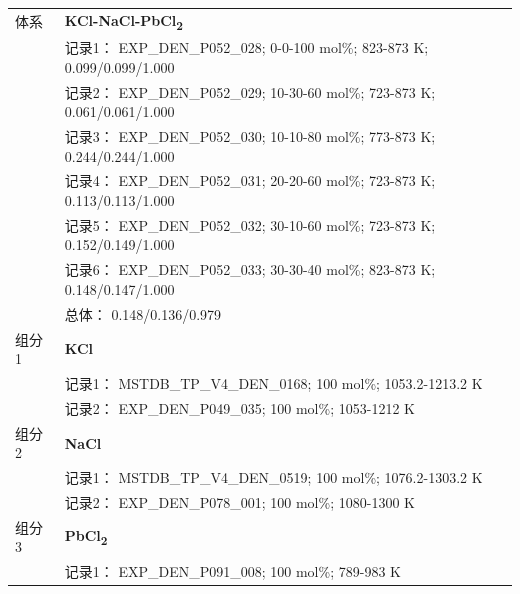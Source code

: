 \documentclass[12pt]{article}
\begin{document}
{\begin{longtable}[]{@{}
  >{\raggedright\arraybackslash}p{}
  >{\raggedright\arraybackslash}p{}@{}}
\midrule
体系 & \textbf{KCl-NaCl-PbCl\textsubscript{2}} \\
 & 记录1： EXP\_DEN\_P052\_028; 0-0-100 mol\%; 823-873 K; 0.099/0.099/1.000 \\
 & 记录2： EXP\_DEN\_P052\_029; 10-30-60 mol\%; 723-873 K; 0.061/0.061/1.000 \\
 & 记录3： EXP\_DEN\_P052\_030; 10-10-80 mol\%; 773-873 K; 0.244/0.244/1.000 \\
 & 记录4： EXP\_DEN\_P052\_031; 20-20-60 mol\%; 723-873 K; 0.113/0.113/1.000 \\
 & 记录5： EXP\_DEN\_P052\_032; 30-10-60 mol\%; 723-873 K; 0.152/0.149/1.000 \\
 & 记录6： EXP\_DEN\_P052\_033; 30-30-40 mol\%; 823-873 K; 0.148/0.147/1.000 \\
 & 总体： 0.148/0.136/0.979  \\

组分 1  & \textbf{KCl} \\
 & 记录1： MSTDB\_TP\_V4\_DEN\_0168; 100 mol\%; 1053.2-1213.2 K \\
 & 记录2： EXP\_DEN\_P049\_035; 100 mol\%; 1053-1212 K  \\

组分 2  & \textbf{NaCl} \\
 & 记录1： MSTDB\_TP\_V4\_DEN\_0519; 100 mol\%; 1076.2-1303.2 K \\
 & 记录2： EXP\_DEN\_P078\_001; 100 mol\%; 1080-1300 K  \\

组分 3  & \textbf{PbCl\textsubscript{2}} \\
 & 记录1： EXP\_DEN\_P091\_008; 100 mol\%; 789-983 K  \\


\end{longtable}}
\end{document}
